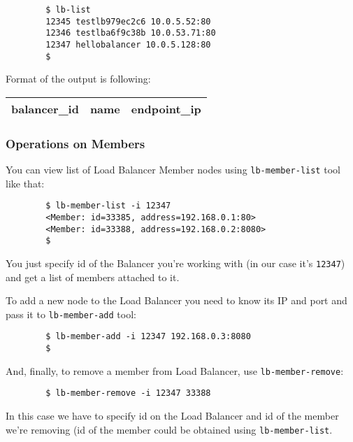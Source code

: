 \documentclass[a4paper]{report}
\begin{document}
                 \begin{verbatim}
		$ lb-list
		12345 testlb979ec2c6 10.0.5.52:80
		12346 testlba6f9c38b 10.0.53.71:80
		12347 hellobalancer 10.0.5.128:80
		$
                 \end{verbatim}

                 Format of the output is following:

                 \begin{center}
                   \begin{tabular}{ | c | c | c | }
                     \hline
                       balancer\_id & name & endpoint\_ip \\
                     \hline
                   \end{tabular}
                 \end{center}

                 \subsubsection{Operations on Members}
                 You can view list of Load Balancer Member nodes using \texttt{lb-member-list} tool like that:

                 \begin{verbatim}
		$ lb-member-list -i 12347
		<Member: id=33385, address=192.168.0.1:80>
		<Member: id=33388, address=192.168.0.2:8080>
		$
                 \end{verbatim}

                 You just specify id of the Balancer you're working with (in our case it's \texttt{12347}) and get
                 a list of members attached to it.

                 To add a new node to the Load Balancer you need to know its IP and port and pass it to \texttt{lb-member-add}
                 tool:

                 \begin{verbatim}
		$ lb-member-add -i 12347 192.168.0.3:8080
		$
                 \end{verbatim}

                 And, finally, to remove a member from Load Balancer, use \texttt{lb-member-remove}:

                 \begin{verbatim}
		$ lb-member-remove -i 12347 33388
                 \end{verbatim}

                 In this case we have to specify id on the Load Balancer and id of the member we're removing (id of
                 the member could be obtained using \texttt{lb-member-list}.
\end{document}
